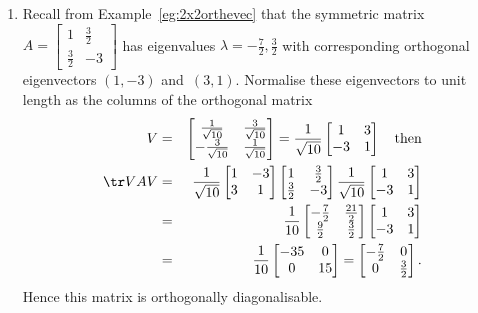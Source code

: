 \begin{example} \label{eg:}
\begin{enumerate}
\item\label{eg:2x2orthdiag} Recall from Example~\ref{eg:2x2orthevec} that the symmetric matrix \(A=\begin{bmatrix} 1&\frac32\\\frac32&-3 \end{bmatrix}\) has eigenvalues \(\lambda=-\tfrac72,\tfrac32\) with corresponding orthogonal eigenvectors \((1,-3)\) and~\((3,1)\).
Normalise these eigenvectors to unit length as the columns of the orthogonal matrix
\begin{eqnarray*}
V&=&\begin{bmatrix} \frac1{\sqrt{10}} & \frac3{\sqrt{10}}
\\ -\frac3{\sqrt{10}}& \frac1{\sqrt{10}} \end{bmatrix}
=\frac1{\sqrt{10}}\begin{bmatrix} 1&3\\-3&1 \end{bmatrix}
\quad\text{then}
\\\tr VAV&=&\frac1{\sqrt{10}}\begin{bmatrix} 1&-3\\3&1 \end{bmatrix}
\begin{bmatrix} 1&\frac32\\\frac32&-3 \end{bmatrix}
\frac1{\sqrt{10}}\begin{bmatrix} 1&3\\-3&1 \end{bmatrix}
\\&=&\frac1{10}\begin{bmatrix} -\frac72&\frac{21}2\\\frac92&\frac32 \end{bmatrix}
\begin{bmatrix} 1&3\\-3&1 \end{bmatrix}
\\&=&\frac1{10}\begin{bmatrix} -35&0\\0&15 \end{bmatrix}
=\begin{bmatrix} -\frac72&0\\0&\frac32 \end{bmatrix}.
\end{eqnarray*}
Hence this matrix is orthogonally diagonalisable.


\end{enumerate}
\end{example}
